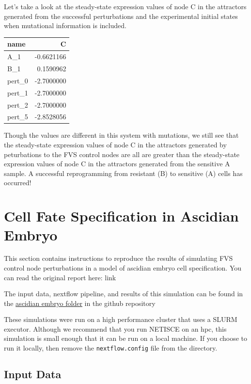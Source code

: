\documentclass[
]{book}
\begin{document}
Let's take a look at the steady-state expression values of node C in the attractors generated from the successful perturbations and the experimental initial states when mutational information is included.

\begin{tabular}{l|r}
\hline
name & C\\
\hline
A\_1 & -0.6621166\\
\hline
B\_1 & 0.1590962\\
\hline
pert\_0 & -2.7000000\\
\hline
pert\_1 & -2.7000000\\
\hline
pert\_2 & -2.7000000\\
\hline
pert\_5 & -2.8528056\\
\hline
\end{tabular}

Though the values are different in this system with mutations, we still see that the steady-state expression values of node C in the attractors generated by peturbations to the FVS control nodes are all are greater than the steady-state expression values of node C in the attractors generated from the sensitive A sample. A successful reprogramming from resistant (B) to sensitive (A) cells has occurred!

\hypertarget{cell-fate-specification-in-ascidian-embryo}{%
\chapter{Cell Fate Specification in Ascidian Embryo}\label{cell-fate-specification-in-ascidian-embryo}}

This section contains instructions to reproduce the results of simulating FVS control node perturbations in a model of ascidian embryo cell specification. You can read the original report here: link

The input data, nextflow pipeline, and results of this simulation can be found in the \href{https://github.com/VeraLiconaResearchGroup/Netisce/tree/main/ascidian_embryo}{ascidian embryo folder} in the github repository

These simulations were run on a high performance cluster that uses a SLURM executor. Although we recommend that you run NETISCE on an hpc, this simulation is small enough that it can be run on a local machine. If you choose to run it locally, then remove the \texttt{nextflow.config} file from the directory.

\hypertarget{input-data}{%
\section{Input Data}\label{input-data}}
\end{document}
